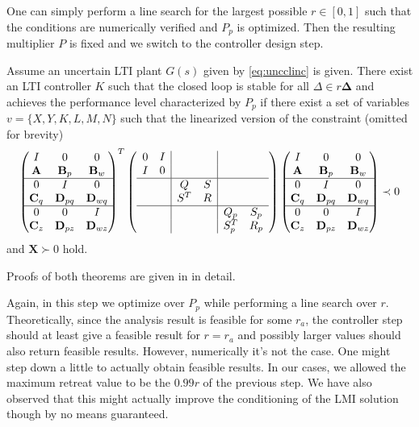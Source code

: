 One can simply perform a line search for the largest possible $r\in[0,1]$ such that the conditions are numerically
verified and $P_p$ is optimized. Then the resulting multiplier $P$ is fixed and we switch to the controller design step.

\begin{thm} Assume an uncertain LTI plant $G(s)$ given by \eqref{eq:uncclinc}
is given. There exist an LTI controller $K$ such that the closed loop is stable for all $\Delta\in r\bm{\Delta}$ and achieves 
the performance level characterized by $P_p$ if there exist a set of variables $v=\{X,Y,K,L,M,N\}$ such that the linearized 
version of the constraint (omitted for brevity)
\begin{equation}
\begin{pmatrix}
I&0&0\\\mathbf{A}&\mathbf{B}_p&\mathbf{B}_w\\\hline
0&I&0\\\mathbf{C}_q&\mathbf{D}_{pq}&\mathbf{D}_{wq}\\\hline
0&0&I\\\mathbf{C}_z&\mathbf{D}_{pz}&\mathbf{D}_{wz}
\end{pmatrix}^T
\left(
\begin{array}{cc|cc|cc}
	0&I&&&&\\
	I&0&&&&\\\hline
	&&Q&S&&\\
	&&S^T&R&&\\\hline
	&&&&Q_p&S_p\\
	&&&&S_p^T&R_p\\
\end{array}
\right)
\begin{pmatrix}
I&0&0\\\mathbf{A}&\mathbf{B}_p&\mathbf{B}_w\\\hline
0&I&0\\\mathbf{C}_q&\mathbf{D}_{pq}&\mathbf{D}_{wq}\\\hline
0&0&I\\\mathbf{C}_z&\mathbf{D}_{pz}&\mathbf{D}_{wz}
\end{pmatrix}\prec 0
\label{eq:thmsynthLMI}
\end{equation}
and $\mathbf{X}\succ 0$ hold.
\end{thm}

Proofs of both theorems are given in \cite{lmibook99} in detail. 


Again, in this step we optimize over $P_p$ while performing a line search over $r$. Theoretically, since the analysis result
is feasible for some $r_a$, the controller step should at least give a feasible result for $r=r_a$ and possibly larger values
should also return feasible results. However, numerically it's not the case. One might step down a little to actually obtain 
feasible results. In our cases, we allowed the maximum retreat value to be the $0.99r$ of the previous step. We have also 
observed that this might actually improve the conditioning of the LMI solution though by no means guaranteed. 

